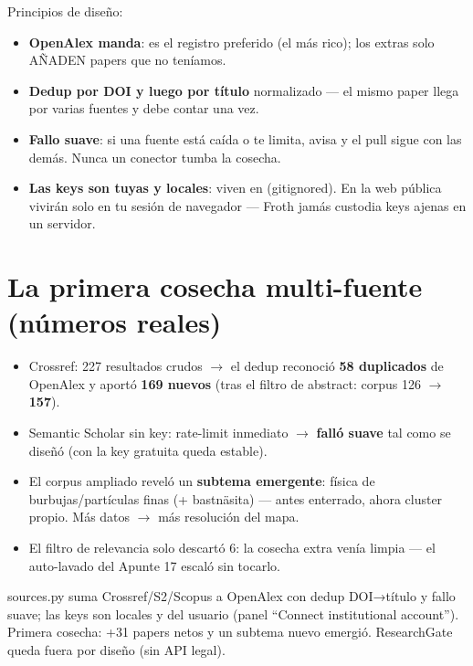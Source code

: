 \documentclass[11pt,a4paper]{article}
\begin{document}
Principios de diseño:
\begin{itemize}
  \item \textbf{OpenAlex manda}: es el registro preferido (el más rico); los extras solo
        AÑADEN papers que no teníamos.
  \item \textbf{Dedup por DOI y luego por título} normalizado — el mismo paper llega por
        varias fuentes y debe contar una vez.
  \item \textbf{Fallo suave}: si una fuente está caída o te limita, avisa y el pull sigue
        con las demás. Nunca un conector tumba la cosecha.
  \item \textbf{Las keys son tuyas y locales}: viven en  (gitignored).
        En la web pública vivirán solo en tu sesión de navegador — Froth jamás custodia
        keys ajenas en un servidor.
\end{itemize}

\section{La primera cosecha multi-fuente (números reales)}

\begin{itemize}
  \item Crossref: 227 resultados crudos $\rightarrow$ el dedup reconoció \textbf{58
        duplicados} de OpenAlex y aportó \textbf{169 nuevos} (tras el filtro de abstract:
        corpus 126 $\rightarrow$ \textbf{157}).
  \item Semantic Scholar sin key: rate-limit inmediato $\rightarrow$ \textbf{falló suave} tal
        como se diseñó (con la key gratuita queda estable).
  \item El corpus ampliado reveló un \textbf{subtema emergente}: física de
        burbujas/partículas finas (+ bastnäsita) — antes enterrado, ahora cluster propio.
        Más datos $\rightarrow$ más resolución del mapa.
  \item El filtro de relevancia solo descartó 6: la cosecha extra venía limpia — el
        auto-lavado del Apunte 17 escaló sin tocarlo.
\end{itemize}

\begin{resumen}
sources.py suma Crossref/S2/Scopus a OpenAlex con dedup DOI→título y fallo suave; las keys
son locales y del usuario (panel ``Connect institutional account''). Primera cosecha: +31
papers netos y un subtema nuevo emergió. ResearchGate queda fuera por diseño (sin API legal).
\end{resumen}
\clearpage
{}
{}
\end{document}

